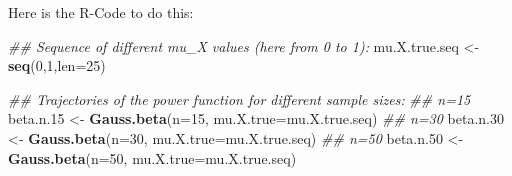 \documentclass[]{book}
\newenvironment{Shaded}{\begin{snugshade}}{\end{snugshade}}
\newcommand{\CommentTok}[1]{\textcolor[rgb]{0.56,0.35,0.01}{\textit{#1}}}
\newcommand{\DataTypeTok}[1]{\textcolor[rgb]{0.13,0.29,0.53}{#1}}
\newcommand{\DecValTok}[1]{\textcolor[rgb]{0.00,0.00,0.81}{#1}}
\newcommand{\FloatTok}[1]{\textcolor[rgb]{0.00,0.00,0.81}{#1}}
\newcommand{\KeywordTok}[1]{\textcolor[rgb]{0.13,0.29,0.53}{\textbf{#1}}}
\newcommand{\NormalTok}[1]{#1}
\newcommand{\StringTok}[1]{\textcolor[rgb]{0.31,0.60,0.02}{#1}}
\theoremstyle{definition}
\theoremstyle{definition}
\theoremstyle{definition}
\theoremstyle{remark}
\begin{document}
Here is the R-Code to do this:

\begin{Shaded}
\begin{Highlighting}[]
\CommentTok{## Sequence of different mu_X values (here from 0 to 1):}
\NormalTok{mu.X.true.seq   <-}\StringTok{ }\KeywordTok{seq}\NormalTok{(}\DecValTok{0}\NormalTok{,}\DecValTok{1}\NormalTok{,}\DataTypeTok{len=}\DecValTok{25}\NormalTok{)}

\CommentTok{## Trajectories of the power function for different sample sizes:}
\CommentTok{## n=15}
\NormalTok{beta.n}\FloatTok{.15}\NormalTok{       <-}\StringTok{ }\KeywordTok{Gauss.beta}\NormalTok{(}\DataTypeTok{n=}\DecValTok{15}\NormalTok{, }\DataTypeTok{mu.X.true=}\NormalTok{mu.X.true.seq)}
\CommentTok{## n=30}
\NormalTok{beta.n}\FloatTok{.30}\NormalTok{       <-}\StringTok{ }\KeywordTok{Gauss.beta}\NormalTok{(}\DataTypeTok{n=}\DecValTok{30}\NormalTok{, }\DataTypeTok{mu.X.true=}\NormalTok{mu.X.true.seq)}
\CommentTok{## n=50}
\NormalTok{beta.n}\FloatTok{.50}\NormalTok{       <-}\StringTok{ }\KeywordTok{Gauss.beta}\NormalTok{(}\DataTypeTok{n=}\DecValTok{50}\NormalTok{, }\DataTypeTok{mu.X.true=}\NormalTok{mu.X.true.seq)}


\end{Highlighting}
\end{Shaded}
\end{document}
